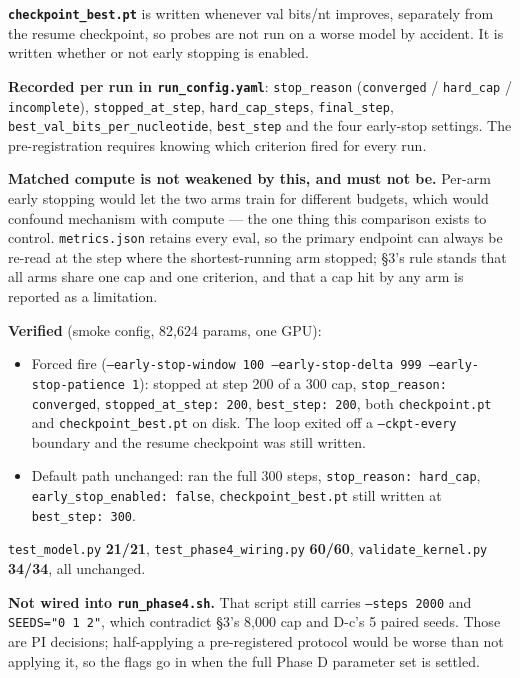 \documentclass[11pt,a4paper]{article}
\newcommand{\code}[1]{\texttt{\small #1}}
\begin{document}
\textbf{\code{checkpoint\_best.pt}} is written whenever val bits/nt improves,
separately from the resume checkpoint, so probes are not run on a worse model
by accident. It is written whether or not early stopping is enabled.

\textbf{Recorded per run in \code{run\_config.yaml}}: \code{stop\_reason}
(\code{converged} / \code{hard\_cap} / \code{incomplete}),
\code{stopped\_at\_step}, \code{hard\_cap\_steps}, \code{final\_step},
\code{best\_val\_bits\_per\_nucleotide}, \code{best\_step} and the four
early-stop settings. The pre-registration requires knowing which criterion
fired for every run.

\textbf{Matched compute is not weakened by this, and must not be.} Per-arm
early stopping would let the two arms train for different budgets, which would
confound mechanism with compute --- the one thing this comparison exists to
control. \code{metrics.json} retains every eval, so the primary endpoint can
always be re-read at the step where the shortest-running arm stopped; \S3's
rule stands that all arms share one cap and one criterion, and that a cap hit
by any arm is reported as a limitation.

\textbf{Verified} (smoke config, 82{,}624 params, one GPU):
\begin{itemize}
\item Forced fire (\code{--early-stop-window 100 --early-stop-delta 999
--early-stop-patience 1}): stopped at step 200 of a 300 cap,
\code{stop\_reason: converged}, \code{stopped\_at\_step: 200},
\code{best\_step: 200}, both \code{checkpoint.pt} and
\code{checkpoint\_best.pt} on disk. The loop exited off a
\code{--ckpt-every} boundary and the resume checkpoint was still written.
\item Default path unchanged: ran the full 300 steps,
\code{stop\_reason: hard\_cap}, \code{early\_stop\_enabled: false},
\code{checkpoint\_best.pt} still written at \code{best\_step: 300}.
\end{itemize}

\code{test\_model.py} \textbf{21/21}, \code{test\_phase4\_wiring.py}
\textbf{60/60}, \code{validate\_kernel.py} \textbf{34/34}, all unchanged.

\textbf{Not wired into \code{run\_phase4.sh}.} That script still carries
\code{--steps 2000} and \code{SEEDS="0 1 2"}, which contradict \S3's 8{,}000
cap and D-c's 5 paired seeds. Those are PI decisions; half-applying a
pre-registered protocol would be worse than not applying it, so the flags go
in when the full Phase D parameter set is settled.
\end{document}

